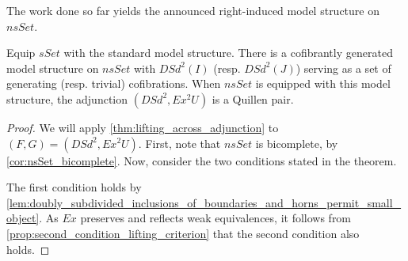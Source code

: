 The work done so far yields the announced right-induced model structure on $nsSet$.
\begin{proposition}\label{prop:main_homotopy_theory}
Equip $sSet$ with the standard model structure. There is a cofibrantly generated model structure on $nsSet$ with $DSd^2(I)$ (resp. $DSd^2(J)$) serving as a set of generating (resp. trivial) cofibrations. When $nsSet$ is equipped with this model structure, the adjunction $(DSd^2,Ex^2U)$ is a Quillen pair.
\end{proposition}
\begin{proof}
We will apply \cref{thm:lifting_across_adjunction} to $(F,G)=(DSd^2,Ex^2U)$. First, note that $nsSet$ is bicomplete, by \cref{cor:nsSet_bicomplete}. Now, consider the two conditions stated in the theorem.

The first condition holds by \cref{lem:doubly_subdivided_inclusions_of_boundaries_and_horns_permit_small_object}. As $Ex$ preserves and reflects weak equivalences, it follows from \cref{prop:second_condition_lifting_criterion} that the second condition also holds.
\end{proof}



